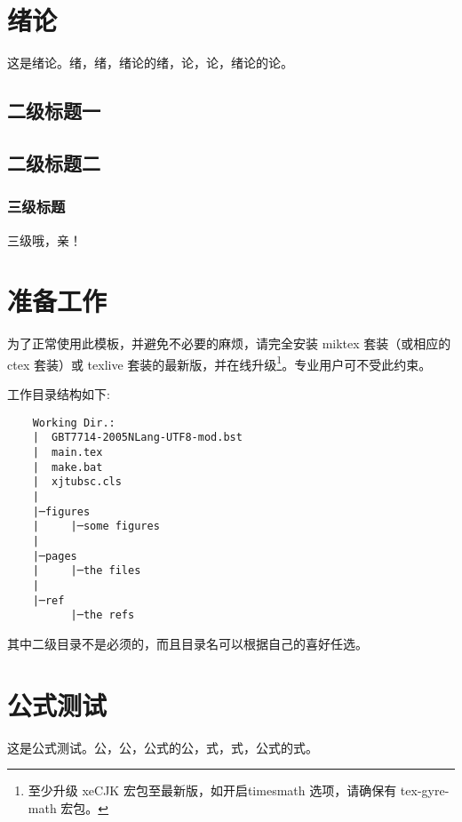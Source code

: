 \documentclass[%
               print, 
              ]{xjtubsc}
\begin{document}

\begin{abstracten} %
\Blindtext[2][1] %

\end{abstracten}


\tableofcontents %


\mainmatter

\section{绪论}
这是绪论。绪，绪，绪论的绪，论，论，绪论的论。
\subsection{二级标题一}
\blindtext %
\subsection{二级标题二}
\blinditemize %
\subsubsection{三级标题}
三级哦，亲！

\section{准备工作}

为了正常使用此模板，并避免不必要的麻烦，请完全安装 miktex 套装（或相应的 ctex 套装）或 texlive 套装的最新版，并在线升级\footnote{至少升级 xeCJK 宏包至最新版，如开启timesmath 选项，请确保有 tex-gyre-math 宏包。}。专业用户可不受此约束。

工作目录结构如下:
\begin{verbatim}
    Working Dir.:
    |  GBT7714-2005NLang-UTF8-mod.bst
    |  main.tex
    |  make.bat
    |  xjtubsc.cls
    |
    |─figures
    |     |─some figures
    |
    |─pages
    |     |─the files
    |
    |─ref
          |─the refs
\end{verbatim}
其中二级目录不是必须的，而且目录名可以根据自己的喜好任选。



\section{公式测试}
这是公式测试。公，公，公式的公，式，式，公式的式。
\end{document}
